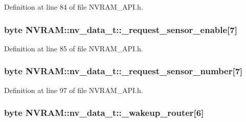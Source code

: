 Definition at line 84 of file N\-V\-R\-A\-M\-\_\-\-A\-P\-I.\-h.

\hypertarget{struct_n_v_r_a_m_1_1nv__data__t_a7a4f7002e162d6e8a4f56db4dd1b4793}{
\subsubsection[{\-\_\-request\-\_\-sensor\-\_\-enable}]{\setlength{\rightskip}{0pt plus 5cm}byte N\-V\-R\-A\-M\-::nv\-\_\-data\-\_\-t\-::\-\_\-request\-\_\-sensor\-\_\-enable\mbox{[}7\mbox{]}}}\label{struct_n_v_r_a_m_1_1nv__data__t_a7a4f7002e162d6e8a4f56db4dd1b4793}


Definition at line 85 of file N\-V\-R\-A\-M\-\_\-\-A\-P\-I.\-h.

\hypertarget{struct_n_v_r_a_m_1_1nv__data__t_ae5a182afd183fd45ebaf344d3e6b02f6}{
\subsubsection[{\-\_\-request\-\_\-sensor\-\_\-number}]{\setlength{\rightskip}{0pt plus 5cm}byte N\-V\-R\-A\-M\-::nv\-\_\-data\-\_\-t\-::\-\_\-request\-\_\-sensor\-\_\-number\mbox{[}7\mbox{]}}}\label{struct_n_v_r_a_m_1_1nv__data__t_ae5a182afd183fd45ebaf344d3e6b02f6}


Definition at line 97 of file N\-V\-R\-A\-M\-\_\-\-A\-P\-I.\-h.

\hypertarget{struct_n_v_r_a_m_1_1nv__data__t_a94912aef206ddb9377726fdbc3b75e72}{
\subsubsection[{\-\_\-wakeup\-\_\-router}]{\setlength{\rightskip}{0pt plus 5cm}byte N\-V\-R\-A\-M\-::nv\-\_\-data\-\_\-t\-::\-\_\-wakeup\-\_\-router\mbox{[}6\mbox{]}}}\label{struct_n_v_r_a_m_1_1nv__data__t_a94912aef206ddb9377726fdbc3b75e72}


